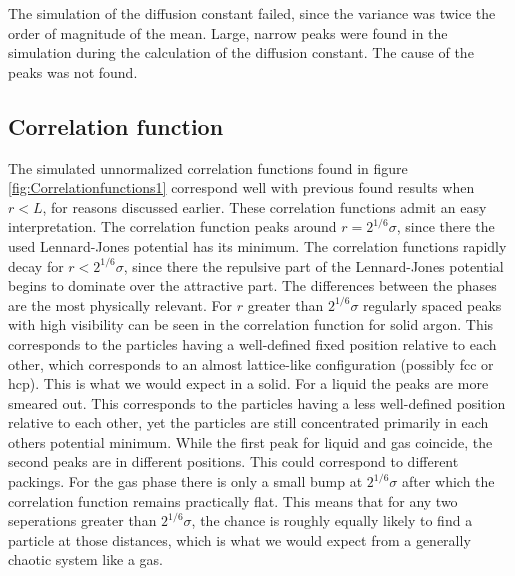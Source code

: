 The simulation of the diffusion constant failed, since the variance was twice the order of magnitude of the mean. Large, narrow peaks were found in the simulation during the calculation of the diffusion constant. The cause of the peaks was not found.

\subsection{Correlation function}

The simulated unnormalized correlation functions found in figure \ref{fig:Correlationfunctions1} correspond well with previous found results \cite{PhysRev.136.A405}\cite{yoon1981radial}\cite{franchetti1975radial}\cite{jos} when $r<L$, for reasons discussed earlier. These correlation functions admit an easy interpretation. The correlation function peaks around $r = 2^{1/6} \sigma$, since there the used Lennard-Jones potential has its minimum. The correlation functions rapidly decay for $r<2^{1/6} \sigma$, since there the repulsive part of the Lennard-Jones potential begins to dominate over the attractive part. The differences between the phases are the most physically relevant. For $r$ greater than $2^{1/6}\sigma$ regularly spaced peaks with high visibility can be seen in the correlation function for solid argon. This corresponds to the particles having a well-defined fixed position relative to each other, which corresponds to an almost lattice-like configuration (possibly fcc or hcp\cite{van1991can}). This is what we would expect in a solid. For a liquid the peaks are more smeared out. This corresponds to the particles having a less well-defined position relative to each other, yet the particles are still concentrated primarily in each others potential minimum. While the first peak for liquid and gas coincide, the second peaks are in different positions. This could correspond to different packings. For the gas phase there is only a small bump at $2^{1/6}\sigma$ after which the correlation function remains practically flat. This means that for any two seperations greater than $2^{1/6}\sigma$, the chance is roughly equally likely to find a particle at those distances, which is what we would expect from a generally chaotic system like a gas.








